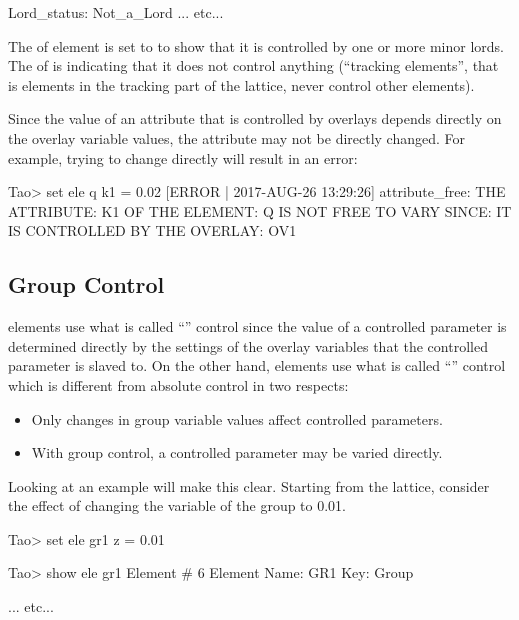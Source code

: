 \documentclass{hitec}     %
\begin{document}
{\begin{code}
Lord_status:  Not_a_Lord
        ... etc...
\end{code}

The  of element  is set to  to show that it is controlled by
one or more minor lords. The  of  is  indicating that it does
not control anything (``tracking elements'', that is elements in the tracking part of the lattice,
never control other elements).

Since the value of an attribute that is controlled by overlays depends directly on the overlay
variable values, the attribute may not be directly changed. For example, trying to change
 directly will result in an error:
\begin{code}
Tao> set ele q k1 = 0.02
[ERROR | 2017-AUG-26 13:29:26] attribute_free:
    THE ATTRIBUTE: K1
    OF THE ELEMENT: Q
    IS NOT FREE TO VARY SINCE:
    IT IS CONTROLLED BY THE OVERLAY: OV1
\end{code}

\subsection{Group Control}

 elements use what is called ``'' control since the value of a controlled
parameter is determined directly by the settings of the overlay variables that the controlled
parameter is slaved to.  On the other hand,  elements use what is called ``''
control which is different from absolute control in two respects:
\begin{itemize}
\item
Only changes in group variable values affect controlled parameters.
\item
With group control, a controlled parameter may be varied directly.
\end{itemize}

Looking at an example will make this clear. Starting from the  lattice, consider the effect
of changing the  variable of the group  to 0.01.
\begin{code} 
Tao> set ele gr1 z = 0.01

Tao> show ele gr1
 Element #                6
 Element Name: GR1
 Key: Group

... etc...    


\end{code}}
\end{document}
